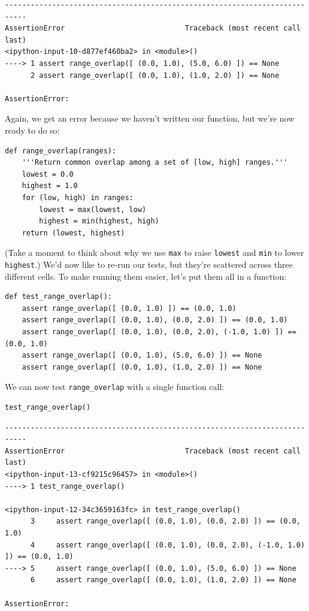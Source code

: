 \documentclass{book}
\begin{document}
\begin{verbatim}
---------------------------------------------------------------------------
AssertionError                            Traceback (most recent call last)
<ipython-input-10-d877ef460ba2> in <module>()
----> 1 assert range_overlap([ (0.0, 1.0), (5.0, 6.0) ]) == None
      2 assert range_overlap([ (0.0, 1.0), (1.0, 2.0) ]) == None

AssertionError: 
\end{verbatim}

Again, we get an error because we haven't written our function, but
we're now ready to do so:

\begin{verbatim}
def range_overlap(ranges):
    '''Return common overlap among a set of [low, high] ranges.'''
    lowest = 0.0
    highest = 1.0
    for (low, high) in ranges:
        lowest = max(lowest, low)
        highest = min(highest, high)
    return (lowest, highest)
\end{verbatim}

(Take a moment to think about why we use \texttt{max} to raise
\texttt{lowest} and \texttt{min} to lower \texttt{highest}.) We'd now
like to re-run our tests, but they're scattered across three different
cells. To make running them easier, let's put them all in a function:

\begin{verbatim}
def test_range_overlap():
    assert range_overlap([ (0.0, 1.0) ]) == (0.0, 1.0)
    assert range_overlap([ (0.0, 1.0), (0.0, 2.0) ]) == (0.0, 1.0)
    assert range_overlap([ (0.0, 1.0), (0.0, 2.0), (-1.0, 1.0) ]) == (0.0, 1.0)
    assert range_overlap([ (0.0, 1.0), (5.0, 6.0) ]) == None
    assert range_overlap([ (0.0, 1.0), (1.0, 2.0) ]) == None
\end{verbatim}

We can now test \texttt{range\_overlap} with a single function call:

\begin{verbatim}
test_range_overlap()
\end{verbatim}

\begin{verbatim}
---------------------------------------------------------------------------
AssertionError                            Traceback (most recent call last)
<ipython-input-13-cf9215c96457> in <module>()
----> 1 test_range_overlap()

<ipython-input-12-34c3659163fc> in test_range_overlap()
      3     assert range_overlap([ (0.0, 1.0), (0.0, 2.0) ]) == (0.0, 1.0)
      4     assert range_overlap([ (0.0, 1.0), (0.0, 2.0), (-1.0, 1.0) ]) == (0.0, 1.0)
----> 5     assert range_overlap([ (0.0, 1.0), (5.0, 6.0) ]) == None
      6     assert range_overlap([ (0.0, 1.0), (1.0, 2.0) ]) == None

AssertionError: 
\end{verbatim}
\end{document}
